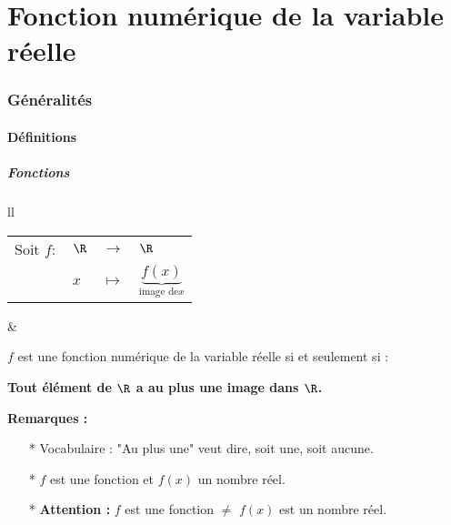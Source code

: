 \ifdefined\COMPLETE
\else
    
    
\fi


\setcounter{section}{0}

\vspace*{-2cm} 

\part{Fonction numérique de la variable réelle}

\section{Généralités}

\subsection{Définitions}

\subsubsection{Fonctions}

\begin{tabular}{ll}
\begin{minipage}{4cm}
\begin{tabular}{llll}
\hspace{-.5cm} Soit $f:$ & $ \R$ &  $\rightarrow$ & $\R$ \\
& $x$ & $\mapsto$ & \hspace*{-.5cm}$\underbrace{f(x)}_{\textrm{image de} x}$ \\
\end{tabular}
\end{minipage}
&
\begin{minipage}{11cm}
$f$ est une fonction numérique de la variable réelle si et seulement si :

\textbf{Tout élément de $\mathbf{\R}$ a au plus une image dans $\mathbf{\R}$.} \\
\end{minipage}
\end{tabular}

\vspace*{.3cm}

\textbf{Remarques :}

\begin{itemize}

\item[*]Vocabulaire : "Au plus une" veut dire, soit une, soit aucune. 

\item[*] $f$ est une fonction et $f(x)$ un nombre réel.

\item[*] \textbf{Attention :} $f$ est une fonction $\neq$ $f(x)$ est un nombre réel.
\end{itemize}

